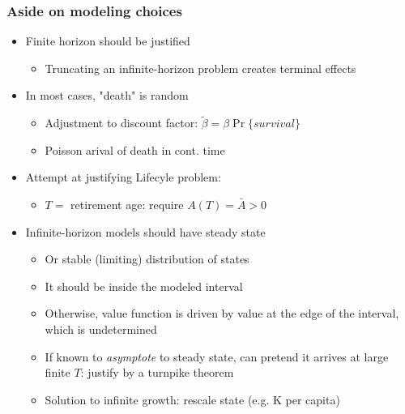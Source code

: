 \documentclass[bigger,handout]{beamer}
\begin{document}
 
\begin{frame}%
 
\frametitle{Aside on modeling choices}

\begin{itemize}
\item Finite horizon should be justified

\begin{itemize}
\item Truncating an infinite-horizon problem creates terminal effects
\end{itemize}

\item In most cases, "death" is random

\begin{itemize}
\item Adjustment to discount factor: $\tilde{\beta}=\beta \Pr \{survival\}$

\item Poisson arival of death in cont. time
\end{itemize}

\item Attempt at justifying Lifecyle problem:

\begin{itemize}
\item $T=$ retirement age: require $A\left( T\right) =\bar{A}>0$ 
\end{itemize}

\item Infinite-horizon models should have steady state

\begin{itemize}
\item Or stable (limiting) distribution of states

\item It should be inside the modeled interval

\item Otherwise, value function is driven by value at the edge of the
interval, which is undetermined

\item If known to \emph{asymptote} to steady state, can pretend it arrives at large finite $T$: justify by a turnpike theorem   

\item Solution to infinite growth: rescale state (e.g. K per
capita)
\end{itemize}
\end{itemize}

 
 
\end{frame}%
 
\end{document}
